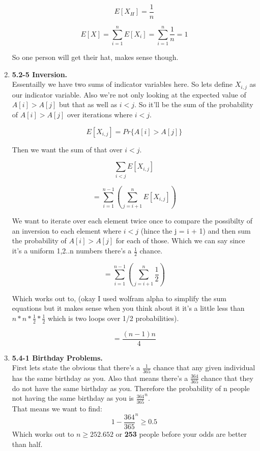 \documentclass{article}
\begin{document}
\begin{enumerate}
        \[E[X_H] = \frac{1}{n}\]

        \[E[X] = \sum_{i=1}^{n} E[X_i] = \sum_{i=1}^{n} \frac{1}{n} = 1\]

        So one person will get their hat, makes sense though. 

        \item \textbf{5.2-5 Inversion.} \\
        
        Essentailly we have two sums of indicator variables here. So lets define $X_{i,j}$ as our indicator variable. Also we're not only looking at the expected value of $A[i] > A[j]$ but that as well as $i < j$. 
        So it'll be the sum of the probability of $A[i] > A[j]$ over iterations where $i < j$.

        \[E[X_{i,j}] = Pr\{A[i] > A[j]\}\]

        Then we want the sum of that over $i < j$.

        \[\sum_{i < j} E[X_{i,j}]\]

        \[= \sum_{i=1}^{n-1}(\sum_{j=i+1}^n E[X_{i,j}])\]

        We want to iterate over each element twice once to compare the possibilty of an inversion to each element where $i < j$ (hince the j = i + 1) and then sum the probability of $A[i] > A[j]$ for each of those. Which we can say since it's a uniform 1,2..n numbers there's a $\frac{1}{2}$ chance.

        \[= \sum_{i=1}^{n-1}(\sum_{j=i+1}^n \frac{1}{2})\]

        Which works out to, (okay I used wolfram alpha to simplify the sum equations but it makes sense when you think about it it's a little less than $n * n * \frac{1}{2} * \frac{1}{2}$ which is two loops over 1/2 probabilities).

        \[= \frac{(n-1)n}{4}\]

        \item \textbf{5.4-1 Birthday Problems.} \\
        
        First lets state the obvious that there's a $\frac{1}{365}$ chance that any given individual has the same birthday as you.
        Also that means there's a $\frac{364}{365}$ chance that they do not have the same birthday as you.
        Therefore the probability of n people not having the same birthday as you is $\frac{364}{365}^n$. \\

        That means we want to find: \[1 - \frac{364}{365}^n \geq 0.5\]
        Which works out to $n \geq 252.652$ or \textbf{253} people before your odds are better than half. \\


\end{enumerate}
\end{document}
